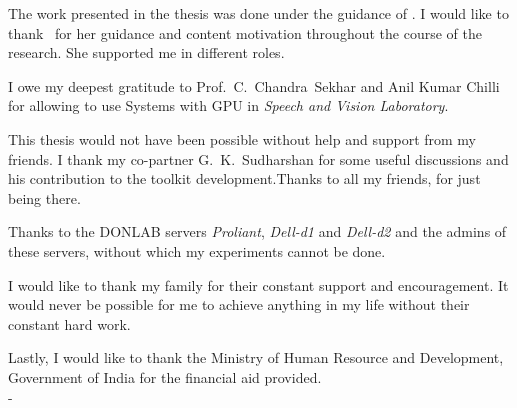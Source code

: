\acknowledgements
The work presented in the thesis was done under the guidance of \thesisguide.  I would like to thank \thesisguide ~for her guidance  and content motivation throughout the course of the research.  She supported me in different roles.

I owe my deepest gratitude to Prof.~C.~Chandra~Sekhar and Anil Kumar Chilli for allowing to use Systems with GPU in {\it Speech and Vision Laboratory}.


This thesis would not have been possible without help and support from my friends.  I thank my co-partner G.~K.~Sudharshan for some useful discussions and his contribution to the toolkit development.Thanks to all my friends, for just being there.

Thanks to the DONLAB servers \textit{Proliant}, \textit{Dell-d1} and \textit{Dell-d2} and the admins of these servers, without which my experiments cannot be done.

I would like to thank my family for their constant support and encouragement.  It would never be possible for me to achieve anything in my life without their constant hard work.

Lastly, I would like to thank the Ministry of Human Resource and Development, Government of India for the financial aid provided.\\

\hfill - \thesisauthor
